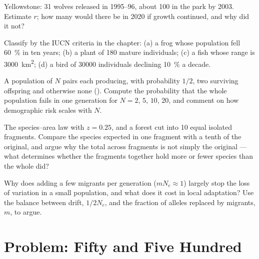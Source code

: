 \begin{exercise}[$\star\star$]\label{exo:b3:conservation-biology:8}
Yellowstone: 31 wolves released in 1995--96, about 100 in the park by
2003. Estimate $r$; how many would there be in 2020 if growth continued,
and why did it not?
\end{exercise}

\begin{exercise}[$\star\star$]\label{exo:b3:conservation-biology:9}
Classify by the IUCN criteria in the chapter: (a) a frog whose
population fell \qty{60}{\%} in ten years; (b) a plant of 180 mature
individuals; (c) a fish whose range is \qty{3000}{km^2}; (d) a bird of
\num{30000} individuals declining \qty{10}{\%} a decade.
\end{exercise}

\begin{exercise}[$\star\star\star$]\label{exo:b3:conservation-biology:10}
A population of $N$ pairs each producing, with probability $1/2$, two
surviving offspring and otherwise none ().
Compute the probability that the whole population fails in one
generation for $N = 2$, $5$, $10$, $20$, and comment on how
demographic risk scales with $N$.
\end{exercise}

\begin{exercise}[$\star\star\star$]\label{exo:b3:conservation-biology:11}
The species--area law with $z = 0.25$, and a forest cut into 10 equal
isolated fragments. Compare the species expected in one fragment with
a tenth of the original, and argue why the total across fragments is
not simply the original --- what determines whether the fragments
together hold more or fewer species than the whole did?
\end{exercise}

\begin{exercise}[$\star\star\star$]\label{exo:b3:conservation-biology:12}
Why does adding a few migrants per generation ($m N_{e} \approx 1$)
largely stop the loss of variation in a small population, and what does
it cost in local adaptation? Use the balance between drift, $1/2N_{e}$,
and the fraction of alleles replaced by migrants, $m$, to argue.
\end{exercise}

\section{Problem: Fifty and Five Hundred}

